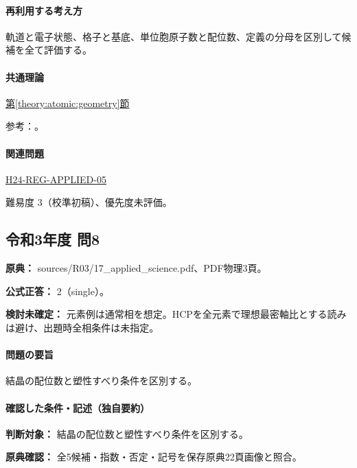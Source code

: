 \paragraph{再利用する考え方} 軌道と電子状態、格子と基底、単位胞原子数と配位数、定義の分母を区別して候補を全て評価する。

\paragraph{共通理論} \hyperref[theory:atomic:geometry]{第\ref*{theory:atomic:geometry}節}

\par 参考：\cite{openstax_crystals}。

\paragraph{関連問題} \hyperref[q:h24-reg-applied-05]{H24-REG-APPLIED-05}

\par 難易度 3（校準初稿）、優先度未評価。

\subsection{令和3年度 問8}
\label{q:r03-reg-applied-08}

\noindent\textbf{原典：} sources/R03/17\_applied\_science.pdf、PDF物理3頁。

\textbf{公式正答：} 2（single）。

\par\textbf{検討未確定：} 元素例は通常相を想定。HCPを全元素で理想最密軸比とする読みは避け、出題時全相条件は未指定。

\paragraph{問題の要旨} 結晶の配位数と塑性すべり条件を区別する。

\paragraph{確認した条件・記述（独自要約）}\mbox{}\par

\noindent\textbf{判断対象：} 結晶の配位数と塑性すべり条件を区別する。\par

\noindent\textbf{原典確認：} 全5候補・指数・否定・記号を保存原典22頁画像と照合。\par

